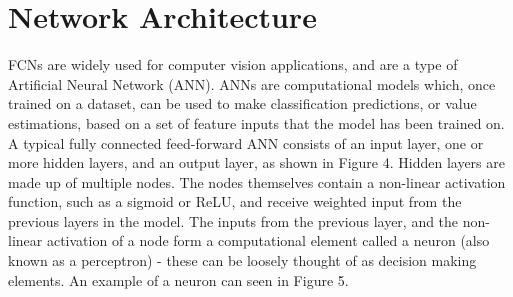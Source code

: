 \documentclass[a4paper]{article}
\begin{document}
\section{Network Architecture}
FCNs are widely used for computer vision applications, and are a type of Artificial Neural Network (ANN). ANNs are computational models which, once trained on a dataset, can be used to make classification predictions, or  value estimations, based on a set of feature inputs that the model has been trained on. A typical fully connected feed-forward ANN consists of an input layer, one or more hidden layers, and an output layer, as shown in Figure 4. Hidden layers are made up of multiple nodes. The nodes themselves contain a non-linear activation function, such as a sigmoid or ReLU, and receive weighted input from the previous layers in the model. The inputs from the previous layer, and the non-linear activation of a node form a computational element called a neuron (also known as a perceptron) - these can be loosely thought of as decision making elements. An example of a neuron can seen in Figure 5.
\end{document}
